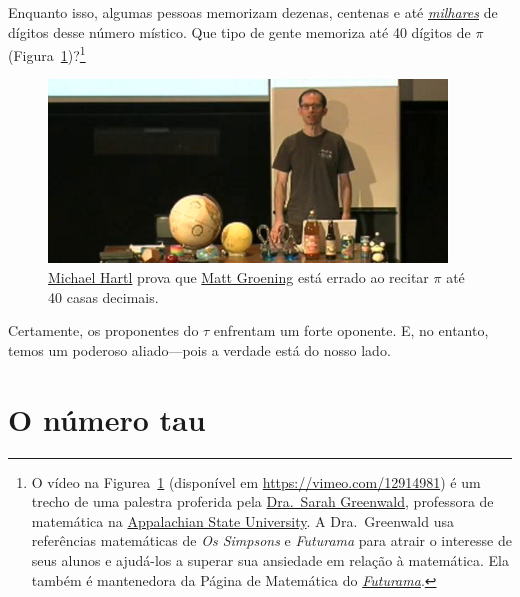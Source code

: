 Enquanto isso, algumas pessoas memorizam dezenas, centenas e até \href{https://www.guinnessworldrecords.com/world-records/most-pi-places-memorised}{\emph{milhares}} de dígitos desse número místico. Que tipo de gente memoriza até 40 dígitos de $\pi$ (Figura~\ref{fig:futurama_video})?\footnote{O vídeo na Figurea~\ref{fig:futurama_video} (disponível em \href{https://vimeo.com/12914981}{https://vimeo.com/12914981}) é um trecho de uma palestra proferida pela \href{https://cs.appstate.edu/~sjg/}{Dra.\ Sarah Greenwald}, professora de matemática na \href{https://www.appstate.edu/}{Appalachian State University}. A Dra.\ Greenwald usa referências matemáticas de \emph{Os Simpsons} e \emph{Futurama} para atrair o interesse de seus alunos e ajudá-los a superar sua ansiedade em relação à matemática. Ela também é mantenedora da Página de Matemática do \href{https://cs.appstate.edu/~sjg/futurama/}{\emph{Futurama}}.}

\begin{figure}
\begin{center}
\includegraphics{images/figures/futurama_math_lecture.png} %
\end{center}
\caption{\href{https://tauday.com/tau-manifesto/\#sec-about_the_author}{Michael Hartl} prova que \href{https://en.wikipedia.org/wiki/Matt_Groening}{Matt Groening} está errado ao recitar $\pi$ até 40 casas decimais.\label{fig:futurama_video}}
\end{figure}

Certamente, os proponentes do $\tau$ enfrentam um forte oponente. E, no entanto, temos um poderoso aliado---pois a verdade está do nosso lado.


\section{O número tau} %
\label{sec:the_number_tau}

